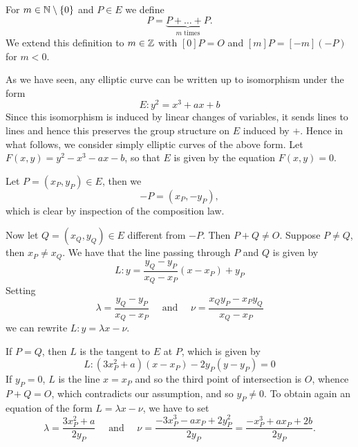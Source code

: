 
\begin{notation}
	For $m \in \mathbb{N}\setminus\{0\}$ and $P \in E$ we define
	\begin{equation*}
		[m]P = \underbrace{P + \dots + P}_{m\textrm{ times}}.
	\end{equation*}
	We extend this definition to $m \in \mathbb{Z}$ with $[0]P = O$ and
	$[m]P = [-m](-P)$ for $m < 0$.
\end{notation}

As we have seen, any elliptic curve can be written up to isomorphism
under the form
\begin{equation*}
	E: y^2 = x^3 + ax + b
\end{equation*}
Since this isomorphism is induced by linear changes of variables, it
sends lines to lines and hence this preserves the group structure on
$E$ induced by $+$. Hence in what follows, we consider simply elliptic curves of
the above form.
Let $F(x, y) = y^2 - x^3 - ax - b$, so that $E$ is given by the equation
$F(x, y) = 0$.

Let $P = (x_P, y_P) \in E$, then we
\begin{equation*}
	-P = (x_P, -y_P),
\end{equation*}
which is clear by inspection of the composition law.

Now let $Q = (x_Q, y_Q) \in E$ different from $-P$. Then $P + Q \neq O$.
Suppose $P \neq Q$, then $x_P \neq x_Q$. 
We have that the line passing through $P$ and $Q$ is given by
\begin{equation*}
	L: y = \frac{y_Q - y_P}{x_Q - x_P}(x - x_P) + y_P
\end{equation*}
Setting 
\begin{equation*}
	\lambda = \frac{y_Q - y_P}{x_Q - x_P}
	\quad\textrm{ and }\quad
	\nu = \frac{x_Qy_P - x_Py_Q}{x_Q - x_P}
\end{equation*}
we can rewrite $L: y = \lambda x - \nu$.

If $P = Q$, then $L$ is the tangent to $E$ at $P$, which is given by
\begin{equation*}
	L: (3x_P^2 + a)(x - x_P) - 2y_P(y - y_P) = 0
\end{equation*}
If $y_P = 0$, $L$ is the line $x = x_P$ and so the third point of intersection
is $O$, whence $P + Q = O$, which contradicts our assumption, and so 
$y_P \neq 0$.
To obtain again an equation of the form $L = \lambda x - \nu$, we have to set
\begin{equation*}
	\lambda = \frac{3x_P^2 + a}{2y_P}
	\quad\textrm{ and }\quad
	\nu = \frac{-3x_P^3 - ax_P + 2y_P^2}{2y_P} = \frac{-x_P^3 + ax_P + 2b}{2y_P}.
\end{equation*}

